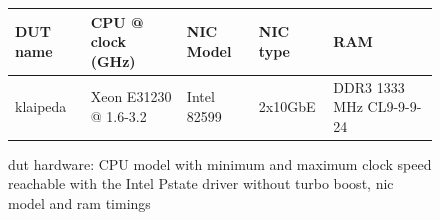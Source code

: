 
\begin{figure}[!ht]
	
	\vspace{5ex}
	\begin{tabular}[]{ l | l | l | l | l }
		DUT name & CPU @ clock (GHz) & NIC Model & NIC type & RAM \\ \hline
		klaipeda & Xeon E31230 @ 1.6-3.2 & Intel 82599 & 2x10GbE & DDR3 1333 MHz CL9-9-9-24 \\
	\end{tabular}
	\caption{\Ac{dut} hardware: CPU model with minimum and maximum clock speed reachable with the Intel Pstate driver without turbo boost, \Ac{nic} model and \Ac{ram} timings}
	\label{table:hardware}
\end{figure}




